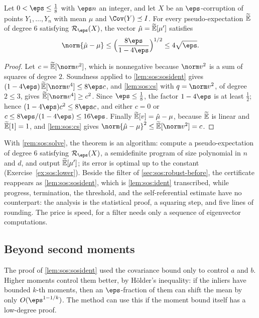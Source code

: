 \begin{refsection}
\begin{theorem}\label{thm:sos:robust}
Let $0<\eps\le\frac18$ with $\eps n$ an integer, and let $X$ be an $\eps$-corruption of points $Y_1,\dots,Y_n$ with mean $\mu$ and $\Cov(Y)\preceq I$. For every pseudo-expectation $\widetilde{\mathbb{E}}$ of degree $6$ satisfying $\sosR_\eps(X)$, the vector $\hat\mu=\widetilde{\mathbb{E}}[\mu']$ satisfies
\[
  \norm{\hat\mu-\mu}\le\Bigl(\frac{8\eps}{1-4\eps}\Bigr)^{1/2}\le4\sqrt\eps.
\]
\end{theorem}

\begin{proof}
Let $c=\sosPE[\norm v^2]$, which is nonnegative because $\norm v^2$ is a sum of squares of degree $2$. Soundness applied to \cref{lem:sos:sosident} gives $(1-4\eps)\,\sosPE[\norm v^4]\le8\eps c$, and \cref{lem:sos:cs} with $q=\norm v^2$, of degree $2\le3$, gives $\sosPE[\norm v^4]\ge c^2$. Since $\eps\le\frac18$, the factor $1-4\eps$ is at least $\frac12$; hence $(1-4\eps)c^2\le8\eps c$, and either $c=0$ or $c\le8\eps/(1-4\eps)\le16\eps$. Finally $\widetilde{\mathbb{E}}[v]=\hat\mu-\mu$, because $\widetilde{\mathbb{E}}$ is linear and $\widetilde{\mathbb{E}}[1]=1$, and \cref{lem:sos:cs} gives $\norm{\hat\mu-\mu}^2\le\sosPE[\norm v^2]=c$.
\end{proof}

With \cref{rem:sos:solve}, the theorem is an algorithm: compute a pseudo-expectation of degree $6$ satisfying $\sosR_\eps(X)$, a semidefinite program of size polynomial in $n$ and $d$, and output $\widetilde{\mathbb{E}}[\mu']$; its error is optimal up to the constant (Exercise~\ref{ex:sos:lower}). Beside the filter of \cref{sec:sos:robust-before}, the certificate reappears as \cref{lem:sos:sosident}, which is \cref{lem:sos:ident} transcribed, while progress, termination, the threshold, and the self-referential estimate have no counterpart: the analysis is the statistical proof, a squaring step, and five lines of rounding. The price is speed, for a filter needs only a sequence of eigenvector computations.

\subsection{Beyond second moments}\label{sec:sos:beyond}

The proof of \cref{lem:sos:sosident} used the covariance bound only to control $a$ and $b$. Higher moments control them better, by H\"older's inequality: if the inliers have bounded $k$-th moments, then an $\eps$-fraction of them can shift the mean by only $O(\eps^{1-1/k})$. The method can use this if the moment bound itself has a low-degree proof.


\end{refsection}
